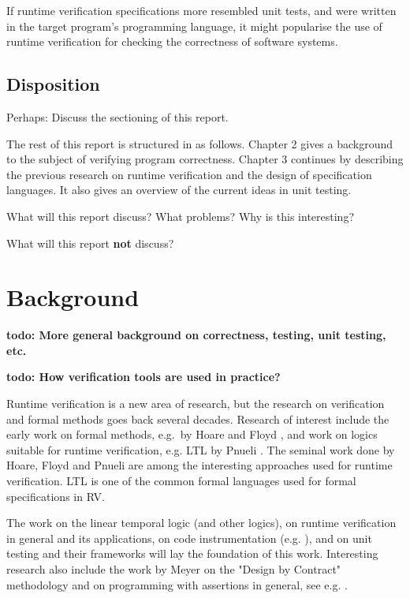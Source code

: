 \documentclass[a4paper,11pt]{kth-mag}
\newcommand{\todo}[1]{\textbf{todo: #1}}
\begin{document}
If runtime verification specifications more resembled unit tests, and were
written in the target program's programming language, it might popularise the
use of runtime verification for checking the correctness of software systems.

\section{Disposition}

Perhaps: Discuss the sectioning of this report.

The rest of this report is structured in as follows. Chapter 2 gives a
background to the subject of verifying program correctness. Chapter 3 continues
by describing the previous research on runtime verification and the design of
specification languages. It also gives an overview of the current ideas in unit
testing.

What will this report discuss? What problems? Why is this interesting?

What will this report \textbf{not} discuss?



\pagestyle{newchap}
\chapter{Background} \label{chapter-background}

\todo{More general background on correctness, testing, unit testing, etc.}

\todo{How verification tools are used in practice?}

Runtime verification is a new area of research, but the research on
verification and formal methods goes back several decades. Research of interest
include the early work on formal methods, e.g.\ by Hoare \cite{hoare69} and
Floyd \cite{floyd67}, and work on logics suitable for runtime verification,
e.g. LTL by Pnueli \cite{pnueli77}. The seminal work done by Hoare, Floyd and
Pnueli are among the interesting approaches used for runtime verification. LTL
is one of the common formal languages used for formal specifications in RV.

The work on the linear temporal logic (and other logics), on runtime
verification in general and its applications, on code instrumentation (e.g.
\cite{aspectj,matusiak09aoppy}), and on unit testing and their frameworks will
lay the foundation of this work. Interesting research also include the work by
Meyer on the "Design by Contract" methodology \cite{meyer92applyingdbc} and on
programming with assertions in general, see e.g.
\cite{rosenblum95practicalassertions,bartetzko01jass}.
\end{document}
